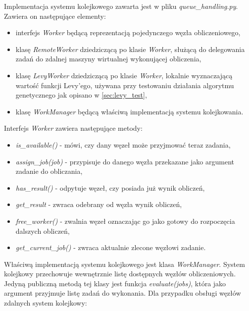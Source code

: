 Implementacja systemu kolejkowego zawarta jest w pliku \textit{queue\_handling.py}.
Zawiera on następujące elementy:

\begin{itemize}
  \item interfejs \textit{Worker} będącą reprezentacją pojedynczego węzła obliczeniowego,
  \item klasę \textit{RemoteWorker} dziedziczącą po klasie \textit{Worker}, służącą do delegowania zadań do zdalnej maszyny wirtualnej wykonującej obliczenia,
  \item klasę \textit{LevyWorker} dziedziczącą po klasie \textit{Worker}, lokalnie wyznaczającą wartość funkcji Levy'ego, używana przy testowaniu działania algorytmu genetycznego jak opisano w \ref{sec:levy_test},
  \item klasę \textit{WorkManager} będącą właściwą implementacją systemu kolejkowania.
\end{itemize}

Interfejs \textit{Worker} zawiera następujące metody:
\begin{itemize}
  \item \textit{is\_available()} - mówi, czy dany węzeł może przyjmować teraz zadania,
  \item \textit{assign\_job(job)} - przypisuje do danego węzła przekazane jako argument zadanie do obliczania,
  \item \textit{has\_result()} - odpytuje węzeł, czy posiada już wynik obliczeń,
  \item \textit{get\_result{}} - zwraca odebrany od węzła wynik obliczeń,
  \item \textit{free\_worker()} - zwalnia węzeł oznaczając go jako gotowy do rozpoczęcia dalszych obliczeń,
  \item \textit{get\_current\_job()} - zwraca aktualnie zlecone węzłowi zadanie.
\end{itemize}

Właściwą implementacją systemu kolejkowego jest klasa \textit{WorkManager}.
System kolejkowy przechowuje wewnętrznie listę dostępnych węzłów obliczeniowych.
Jedyną publiczną metodą tej klasy jest funkcja \textit{evaluate(jobs)}, która jako argument przyjmuje listę zadań do wykonania.
Dla przypadku obsługi węzłów zdalnych system kolejkowy:

